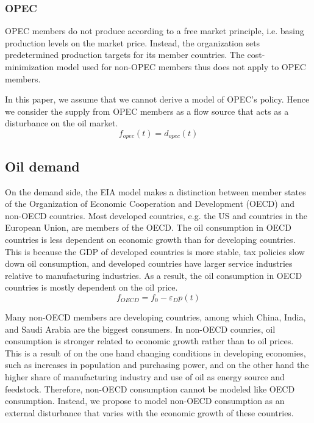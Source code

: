 \subsubsection{OPEC}
OPEC members do not produce according to a free market principle, i.e. basing production levels on the market price.
Instead, the organization sets predetermined production targets for its member countries.
The cost-minimization model used for non-OPEC members thus does not apply to OPEC members.

In this paper, we assume that we cannot derive a model of OPEC's policy.
Hence we consider the supply from OPEC members as a flow source that acts as a disturbance on the oil market.
\begin{equation}
    f_{opec}(t) = d_{opec}(t)
\end{equation}




\subsection{Oil demand}
On the demand side, the EIA model makes a distinction between member states of the Organization of Economic Cooperation and Development (OECD) and non-OECD countries.
Most developed countries, e.g. the US and countries in the European Union, are members of the OECD.
The oil consumption in OECD countries is less dependent on economic growth than for developing countries.
This is because the GDP of developed countries is more stable, tax policies slow down oil consumption, and developed countries have larger service industries relative to manufacturing industries.
As a result, the oil consumption in OECD countries is mostly dependent on the oil price.
\begin{equation}
    f_{OECD} = f_0 - \varepsilon_D p(t)
\end{equation}


Many non-OECD members are developing countries, among which China, India, and Saudi Arabia are the biggest consumers.
In non-OECD counries, oil consumption is stronger related to economic growth rather than to oil prices.
This is a result of on the one hand changing conditions in developing economies, such as increases in population and purchasing power, and on the other hand the higher share of manufacturing industry and use of oil as energy source and feedstock.   
Therefore, non-OECD consumption cannot be modeled like OECD consumption.
Instead, we propose to model non-OECD consumption as an external disturbance that varies with the economic growth of these countries.

